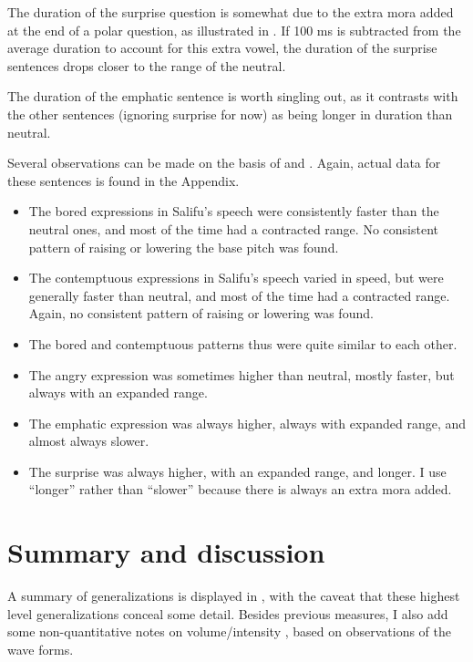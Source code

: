 \documentclass[output=paper]{langsci/langscibook}
\begin{document}
The duration of the surprise question is somewhat due to the extra mora added at the end of a polar question, as illustrated in . If 100 ms is subtracted from the average duration to account for this extra vowel, the duration of the surprise sentences drops closer to the range of the neutral. 

The duration of the emphatic sentence is worth singling out, as it contrasts with the other sentences (ignoring surprise for now) as being longer in duration than neutral. 

Several observations can be made on the basis of  and . Again, actual data for these sentences is found in the Appendix.

\begin{itemize}[noitemsep]
\item The bored expressions in Salifu's speech were consistently faster than the neutral ones, and most of the time had a contracted range. No consistent pattern of raising or lowering the base pitch was found.
\item The contemptuous expressions in Salifu's speech varied in speed, but were generally faster than neutral, and most of the time had a contracted range. Again, no consistent pattern of raising or lowering was found.
\item The bored and contemptuous patterns thus were quite similar to each other.
\item The angry expression was sometimes higher than neutral, mostly faster, but always with an expanded range.
\item The emphatic expression was always higher, always with expanded range, and almost always slower.
\item The surprise was always higher, with an expanded range, and longer. I use ``longer'' rather than ``slower'' because there is always an extra mora added.
\end{itemize}


\section{Summary and discussion}

A summary of generalizations is displayed in , with the caveat that these highest level generalizations conceal some detail. Besides previous measures, I also add some non-quantitative notes on volume/intensity , based on observations of the wave forms. 
\end{document}
